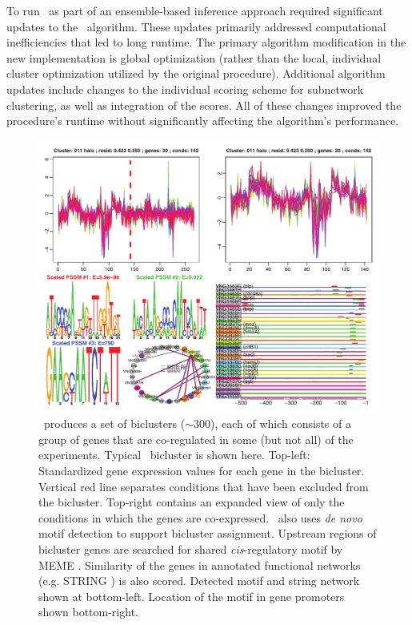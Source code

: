 To run \cm\ as part of an ensemble-based inference approach required significant updates to the \cm\ algorithm. These updates primarily addressed computational inefficiencies that led to long runtime. The primary algorithm modification in the new implementation is global optimization (rather than the local, individual cluster optimization utilized by the original procedure). Additional algorithm updates include changes to the individual scoring scheme for subnetwork clustering, as well as integration of the scores. All of these changes improved the procedure's runtime without significantly affecting the algorithm's performance.

\begin{figure}[h!]
\centering
\includegraphics[width=0.9\linewidth]{figures/bicluster}
\caption[Bicluster: a conditionally co-regulated module]{\cm\ produces a set of biclusters ($\sim$300), each of which consists of a group of genes that are co-regulated in some (but not all) of the experiments. Typical \cm\ bicluster is shown here. Top-left: Standardized gene expression values for each gene in the bicluster. Vertical red line separates conditions that have been excluded from the bicluster. Top-right contains an expanded view of only the conditions in which the genes are co-expressed. \cm\ also uses \textit{de novo} motif detection to support bicluster assignment. Upstream regions of bicluster genes are searched for shared \textit{cis}-regulatory motif by MEME \cite{bailey_fitting_1994}. Similarity of the genes in annotated functional networks (e.g. STRING \cite{szklarczyk_string_2011}) is also scored. Detected motif and string network shown at bottom-left. Location of the motif in gene promoters shown bottom-right.}
\label{fig:bicluster}
\end{figure}

